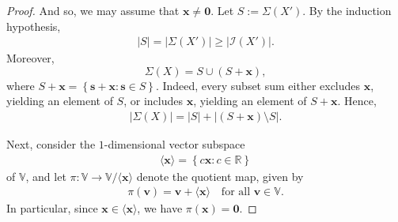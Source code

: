 \documentclass[10pt,a4paper]{amsart}
\newcommand{\VV}{\mathbb{V}} %
\newcommand{\abs}[1]{\left| #1 \right|}
\newcommand{\set}[1]{\left\{ #1 \right\}}
\begin{document}
\begin{proof}
    And so, we may assume that $\mathbf{x} \neq \mathbf{0}$. Let $S := \Sigma(X')$. By the induction hypothesis, \begin{align}\label{induct_X}
        \abs{S} = \abs{\Sigma(X')} \geq \abs{\mathcal{I}(X')}. 
\end{align} Moreover, \[\Sigma(X) = S \cup (S+\mathbf{x}),\] where $S+\mathbf{x} = \set{\mathbf{s}+\mathbf{x} : \mathbf{s} \in S}$. Indeed, every subset sum either excludes $\mathbf{x}$, yielding an element of $S$, or includes $\mathbf{x}$, yielding an element of $S+\mathbf{x}$. Hence, \begin{align}\label{split_sigmaX}
    \abs{\Sigma(X)} = \abs{S} + \abs{(S+\mathbf{x}) \setminus S}.
\end{align}

Next, consider the $1$-dimensional vector subspace \begin{align*}
    \langle \mathbf{x} \rangle = \set{c\mathbf{x} : c \in \mathbb{R}}
\end{align*} of $\VV$, and let $\pi : \VV \to \VV / \langle \mathbf{x} \rangle$ denote the quotient map, given by \begin{align*}
    \pi(\mathbf{v}) = \mathbf{v}+ \langle \mathbf{x} \rangle \quad \text{for all } \mathbf{v} \in \VV.
\end{align*} In particular, since $\mathbf{x} \in \langle \mathbf{x} \rangle$, we have $\pi(\mathbf{x}) = \mathbf{0}$. 


\end{proof}
\end{document}
